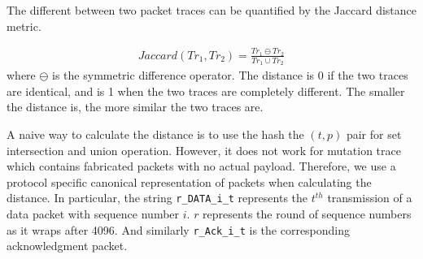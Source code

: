 The different between two packet traces can be quantified by the Jaccard distance
metric.

\begin{align}
  Jaccard(Tr_1, Tr_2) = \frac{Tr_1 \ominus Tr_2}{Tr_1 \cup Tr_2}
\end{align}
where $\ominus$ is the symmetric difference operator.
%
The distance is 0 if the
two traces are identical, and is 1 when the two traces are completely different.
%
The smaller the distance is, the more similar the two traces are.

A naive way to calculate the distance is to use the hash the $(t, p)$ pair for
set intersection and union operation.
%
However, it does not work for mutation
trace which contains fabricated packets with no actual payload.
%
Therefore, we use
a protocol specific canonical representation of packets when calculating the
distance.
%
In particular, the string \texttt{r\_DATA\_i\_t} represents the $t^{th}$
transmission of a data packet with sequence number $i$.
%
$r$ represents the round
of sequence numbers as it wraps after 4096.
%
And similarly \texttt{r\_Ack\_i\_t} is the corresponding acknowledgment packet.

